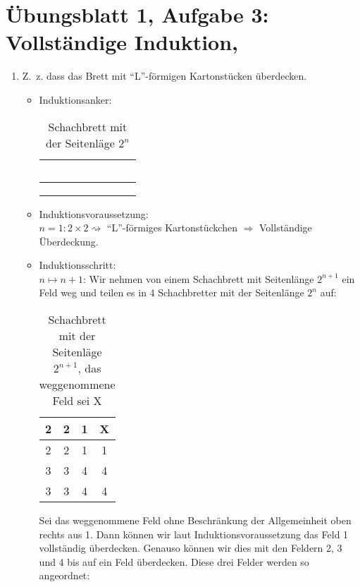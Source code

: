 \documentclass[12pt,a4paper]{report}
\begin{document}
\section{Übungsblatt 1, Aufgabe 3: Vollständige Induktion, \GruppeA}

	\begin{enumerate}
		\item Z.~z. dass das Brett mit \enquote{L}-förmigen Kartonstücken überdecken.
		\begin{itemize}
			\item Induktionsanker:
				\begin{table}[H]
					\centering
					\begin{tabular}{|c|c|c|c|}
						\hline
						~~&~~&~~&~~\\
						\hline
						&&&\\
						\hline
						&&&\\
						\hline
						&&&\\
						\hline
					\end{tabular}
					\caption{Schachbrett mit der Seitenläge $2^n$}
				\end{table}
			\item Induktionsvoraussetzung:\\
			$n=1: 2 \times 2 \rightsquigarrow$ \enquote{L}-förmiges Kartonstückchen $\Rightarrow$ Vollständige Überdeckung.
			
			\item Induktionsschritt:\\
			$n\mapsto n+1$: Wir nehmen von einem Schachbrett mit Seitenlänge $2^{n+1}$ ein Feld weg und teilen es in 4 Schachbretter mit der Seitenlänge $2^n$ auf:
			\begin{table}[H]
				\centering
				\begin{tabular}{|c|c||c|c|}
					\hline
					2 & 2 & 1 & X \\
					\hline
					2 & 2 & 1 & 1 \\
					\hline
					\hline
					3 & 3 & 4 & 4 \\
					\hline
					3 & 3 & 4 & 4 \\
					\hline
				\end{tabular}
				\caption{Schachbrett mit der Seitenläge $2^{n+1} $, das weggenommene Feld sei X}
			\end{table}
			Sei das weggenommene Feld ohne Beschränkung der Allgemeinheit oben rechts aus 1. Dann können wir laut Induktionsvoraussetzung das Feld 1 vollständig überdecken. Genauso können wir dies mit den Feldern 2, 3 und 4 bis auf ein Feld überdecken. Diese drei Felder werden so angeordnet:
			

\end{itemize}
\end{enumerate}
\end{document}
